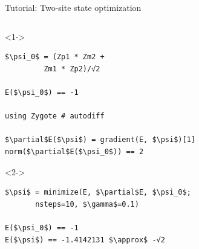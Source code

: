 \begin{frame}[fragile]{Tutorial: Two-site state optimization}

\begin{columns}

\begin{column}{5cm}

\begin{onlyenv}<1->
\begin{lstlisting}[language=JuliaLocal, style=julia, mathescape, basicstyle=\scriptsize\ttfamily]
$\psi_0$ = (Zp1 * Zm2 +
         Zm1 * Zp2)/√2

E($\psi_0$) == -1

using Zygote # autodiff

$\partial$E($\psi$) = gradient(E, $\psi$)[1]
norm($\partial$E($\psi_0$)) == 2
\end{lstlisting}
\end{onlyenv}

\begin{onlyenv}<2->
\begin{lstlisting}[language=JuliaLocal, style=julia, mathescape, basicstyle=\scriptsize\ttfamily]
$\psi$ = minimize(E, $\partial$E, $\psi_0$;
       nsteps=10, $\gamma$=0.1)

E($\psi_0$) == -1
E($\psi$) == -1.4142131 $\approx$ -√2
 \end{lstlisting}
\end{onlyenv}

\end{column}

\begin{column}{5cm}



\end{column}
\end{columns}
\end{frame}
